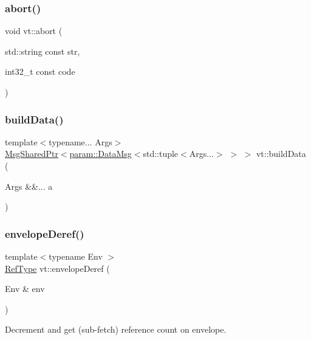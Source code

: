 \subsubsection{\texorpdfstring{abort()}{abort()}}
{\footnotesize\ttfamily void vt\+::abort (\begin{DoxyParamCaption}\item[{std\+::string const}]{str,  }\item[{int32\+\_\+t const}]{code }\end{DoxyParamCaption})}

\mbox{\label{namespacevt_a59494f92a4811ae4f2b5264a50aa78dd}} 
\subsubsection{\texorpdfstring{build\+Data()}{buildData()}}
{\footnotesize\ttfamily template$<$typename... Args$>$ \\
\hyperlink{namespacevt_ab2b3d506ec8e8d1540aede826d84a239}{Msg\+Shared\+Ptr}$<$\hyperlink{structvt_1_1param_1_1_data_msg}{param\+::\+Data\+Msg}$<$std\+::tuple$<$Args...$>$ $>$ $>$ vt\+::build\+Data (\begin{DoxyParamCaption}\item[{Args \&\&...}]{a }\end{DoxyParamCaption})}

\mbox{\label{namespacevt_a6083c0bb47b5d180acb1f32542833e67}} 
\subsubsection{\texorpdfstring{envelope\+Deref()}{envelopeDeref()}}
{\footnotesize\ttfamily template$<$typename Env $>$ \\
\hyperlink{namespacevt_a9b39ce9494bb04674d0d5b895a5aa50f}{Ref\+Type} vt\+::envelope\+Deref (\begin{DoxyParamCaption}\item[{Env \&}]{env }\end{DoxyParamCaption})\hspace{0.3cm}{\ttfamily [inline]}}



Decrement and get (sub-\/fetch) reference count on envelope. 


